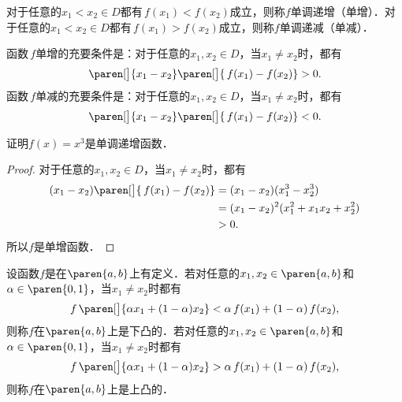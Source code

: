 \begin{definition}
  \label{defn:funcmono}
  对于任意的\(x_1 < x_2 \in D\)都有\(\,f(x_1) < f(x_2)\)成立，则称\(f\)单调递增（单增）．对于任意的\(x_1 < x_2 \in D\)都有\(\,f(x_1) > f(x_2)\)成立，则称\(f\)单调递减（单减）．
\end{definition}

\begin{theorem*}
  函数\(\,f\)单增的充要条件是：对于任意的\(x_1, x_2 \in D\)，当\(x_1 \ne x_2\)时，都有
  \begin{equation*}
    \paren[\big]{x_1 - x_2}\paren[\big]{\,f(x_1) - f(x_2)} > 0.
  \end{equation*}
  函数\(\,f\)单减的充要条件是：对于任意的\(x_1, x_2 \in D\)，当\(x_1 \ne x_2\)时，都有
  \begin{equation*}
    \paren[\big]{x_1 - x_2}\paren[\big]{\,f(x_1) - f(x_2)} < 0.
  \end{equation*}
\end{theorem*}

\begin{example*}
  证明\(f(x) = x^3\)是单调递增函数．

  \begin{proof}
    对于任意的\(x_1, x_2 \in D\)，当\(x_1 \ne x_2\)时，都有
    \[
      \begin{split}
        (x_1 - x_2) \paren[\big]{\,f(x_1) - f(x_2)}
        &= (x_1 - x_2) (x_1^3 - x_2^3) \\
        &= (x_1 - x_2)^2 (x_1^2 + x_1 x_2 + x_2^2) \\
        &> 0.
      \end{split}
    \]
    所以\(f\)是单增函数．
  \end{proof}
\end{example*}

\begin{definition*}
  设函数\(f\)是在\(\paren{a,b}\)上有定义．若对任意的\(x_1, x_2 \in \paren{a,b}\)和\(\alpha \in \paren{0,1}\)，当\(x_1 \ne x_2\)时都有
  \[
    f\,\paren[\big]{\alpha x_1 + (1-\alpha) x_2} < \alpha\,f(x_1) + (1-\alpha)\,f(x_2),
  \]
  则称\(f\)在\(\paren{a,b}\)上是下凸的．若对任意的\(x_1, x_2 \in \paren{a,b}\)和\(\alpha \in \paren{0,1}\)，当\(x_1 \ne x_2\)时都有
  \[
    f\,\paren[\big]{\alpha x_1 + (1-\alpha) x_2} > \alpha\,f(x_1) + (1-\alpha)\,f(x_2),
  \]
  则称\(f\)在\(\paren{a,b}\)上是上凸的．
\end{definition*}

